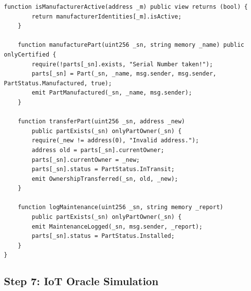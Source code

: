 \documentclass[12pt,a4paper]{article}
\begin{document}
\begin{lstlisting}[caption={Step6\_DIDs.sol -- Adds on-chain identity}]
    function isManufacturerActive(address _m) public view returns (bool) {
        return manufacturerIdentities[_m].isActive;
    }

    function manufacturePart(uint256 _sn, string memory _name) public onlyCertified {
        require(!parts[_sn].exists, "Serial Number taken!");
        parts[_sn] = Part(_sn, _name, msg.sender, msg.sender, PartStatus.Manufactured, true);
        emit PartManufactured(_sn, _name, msg.sender);
    }

    function transferPart(uint256 _sn, address _new)
        public partExists(_sn) onlyPartOwner(_sn) {
        require(_new != address(0), "Invalid address.");
        address old = parts[_sn].currentOwner;
        parts[_sn].currentOwner = _new;
        parts[_sn].status = PartStatus.InTransit;
        emit OwnershipTransferred(_sn, old, _new);
    }

    function logMaintenance(uint256 _sn, string memory _report)
        public partExists(_sn) onlyPartOwner(_sn) {
        emit MaintenanceLogged(_sn, msg.sender, _report);
        parts[_sn].status = PartStatus.Installed;
    }
}
\end{lstlisting}

\subsection{Step 7: IoT Oracle Simulation}
\end{document}
